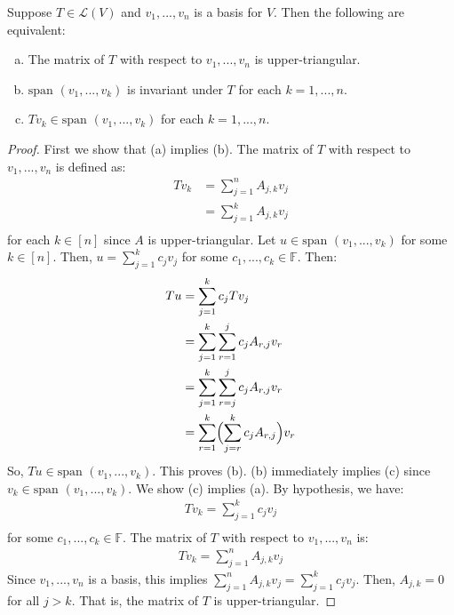 \documentclass{article}
\begin{document}
\begin{theorem}
  \label{thm:conditions-for-upper-triangular-matrix}
  Suppose $T \in \mathcal{L}(V)$ and $v_1, ..., v_n$ is a basis for
  $V$. Then the following are equivalent:
  \begin{enumerate}[(a)]
  \item
    The matrix of $T$ with respect to $v_1, ..., v_n$ is
    upper-triangular.
  \item
    $\text{span }(v_1, ..., v_k)$ is invariant under $T$ for each $k =
    1, ..., n$.
  \item
    $Tv_k \in \text{span }(v_1, ..., v_k)$ for each $k = 1, ..., n$.
  \end{enumerate}
\end{theorem}
\begin{proof}
  First we show that (a) implies (b). The matrix of $T$ with respect
  to $v_1, ..., v_n$ is defined as:
  \begin{align*}
    Tv_k &= \sum_{j=1}^n A_{j, k}v_j \\
         &= \sum_{j=1}^k A_{j, k} v_j \\
  \end{align*}
  for each $k \in [n]$ since $A$ is upper-triangular. Let $u \in \text{span }(v_1, ..., v_k)$ for
  some $k \in [n]$. Then,
  $u = \sum_{j=1}^k c_j v_j$ for some $c_1, ..., c_k \in
  \mathbb{F}$. Then:
  \begin{align*}
    Tu &= \sum_{j=1}^k c_j Tv_j \\
       &= \sum_{j=1}^k \sum_{r=1}^j c_j A_{r, j} v_r \\
    &= \sum_{j=1}^k \sum_{r=j}^j c_j A_{r, j} v_r \\
    &= \sum_{r=1}^k \Bigl( \sum_{j=r}^k c_j A_{r,j} \Bigr) v_r \\
  \end{align*}
  So, $Tu \in \text{span }(v_1, ..., v_k)$. This proves (b). (b)
  immediately implies (c) since $v_k \in \text{span }(v_1, ...,
  v_k)$. We show (c) implies (a). By hypothesis, we have:
  \begin{align*}
    Tv_k = \sum_{j=1}^k c_j v_j \\
  \end{align*}
  for some $c_1, ..., c_k \in \mathbb{F}$. The matrix of $T$ with
  respect to $v_1, ..., v_n$ is:
  \begin{align*}
    Tv_k = \sum_{j=1}^n A_{j, k} v_j
  \end{align*}
  Since $v_1,..., v_n$ is a basis, this implies $\sum_{j=1}^n A_{j,k} v_j
  = \sum_{j=1}^k c_j v_j$. Then, $A_{j, k} = 0$ for all $j > k$. That
  is, the matrix of $T$ is upper-triangular.
\end{proof}
\end{document}
